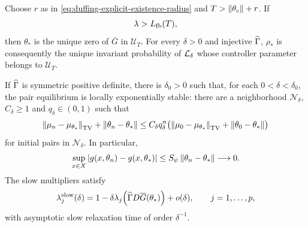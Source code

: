 \begin{theorem}
\label{thm:duffing-main-results}
Choose $r$ as in \eqref{eq:duffing-explicit-existence-radius} and
$T>\left\lVert \theta_c\right\rVert+r$. If
\begin{equation}
  \lambda>L_{\rm fb}(T),
  \label{eq:duffing-feedback-dominance}
\end{equation}
then $\theta_*$ is the unique zero of $\overline G$ in $\mathcal U_T$.
For every $\delta>0$ and injective $\widehat{\Gamma}$, $\rho_*$ is consequently
the unique invariant probability of $\mathcal{L}_\delta$ whose controller
parameter belongs to $\mathcal U_T$.

If $\widehat{\Gamma}$ is symmetric positive definite, there is $\delta_0>0$
such that, for each $0<\delta<\delta_0$, the pair equilibrium is locally
exponentially stable: there are a neighborhood $\mathcal N_\delta$,
$C_\delta\ge1$ and $q_\delta\in(0,1)$ such that
\begin{equation}
\begin{aligned}
  \left\lVert \mu_n-\mu_{\theta_*}\right\rVert_{\rm TV}+\left\lVert \theta_n-\theta_*\right\rVert
  \le C_\delta q_\delta^n
  \bigl(\left\lVert \mu_0-\mu_{\theta_*}\right\rVert_{\rm TV}+\left\lVert \theta_0-\theta_*\right\rVert\bigr)
\end{aligned}
  \label{eq:duffing-local-exp-convergence}
\end{equation}
for initial pairs in $\mathcal N_\delta$. In particular,
\begin{equation}
  \sup_{x\in X}|g(x,\theta_n)-g(x,\theta_*)|
  \le S_\psi\left\lVert \theta_n-\theta_*\right\rVert\longrightarrow0.
  \label{eq:duffing-controller-convergence}
\end{equation}
The slow multipliers satisfy
\begin{equation}
  \lambda_j^{\rm slow}(\delta)
  =1-\delta\lambda_j\!\left(\widehat{\Gamma} D\overline G(\theta_*)\right)
    +o(\delta),\qquad j=1,\ldots,p,
  \label{eq:duffing-slow-multipliers}
\end{equation}
with asymptotic slow relaxation time of order $\delta^{-1}$.
\end{theorem}

